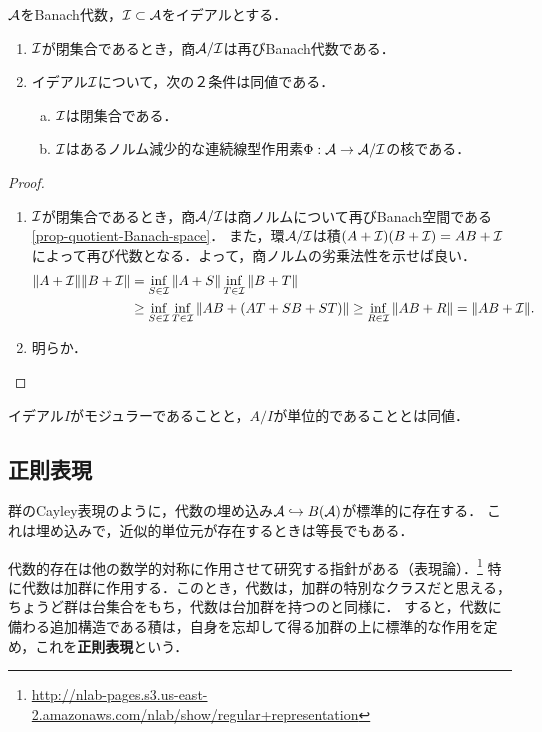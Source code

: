 \documentclass[uplatex,dvipdfmx]{jsreport}
\begin{document}
\begin{lemma}[quotient]
    $\mathcal{A}$をBanach代数，$\mathcal{I}\subset \mathcal{A}$をイデアルとする．
    \begin{enumerate}
        \item $\mathcal{I}$が閉集合であるとき，商$\mathcal{A}/\mathcal{I}$は再びBanach代数である．
        \item イデアル$\mathcal{I}$について，次の２条件は同値である．
        \begin{enumerate}[(a)]
            \item $\mathcal{I}$は閉集合である．
            \item $\mathcal{I}$はあるノルム減少的な連続線型作用素$\Phi:\mathcal{A}\to \mathcal{A}/\mathcal{I}$の核である．
        \end{enumerate}
    \end{enumerate}
\end{lemma}
\begin{proof}\mbox{}
    \begin{enumerate}
        \item $\mathcal{I}$が閉集合であるとき，商$\mathcal{A}/\mathcal{I}$は商ノルムについて再びBanach空間である\ref{prop-quotient-Banach-space}．
        また，環$\mathcal{A}/\mathcal{I}$は積$(A+\mathcal{I})(B+\mathcal{I})=AB+\mathcal{I}$によって再び代数となる．よって，商ノルムの劣乗法性を示せば良い．
        \begin{align*}
            \|A+\mathcal{I}\|\|B+\mathcal{I}\|&=\inf_{S\in\mathcal{I}}\|A+S\|\inf_{T\in\mathcal{I}}\|B+T\|\\
            &\ge\inf_{S\in\mathcal{I}}\inf_{T\in\mathcal{I}}\|AB+(AT+SB+ST)\|\ge\inf_{R\in\mathcal{I}}\|AB+R\|=\|AB+\mathcal{I}\|.
        \end{align*}
        \item 明らか．
    \end{enumerate}
\end{proof}

\begin{lemma}
    イデアル$I$がモジュラーであることと，$A/I$が単位的であることとは同値．
\end{lemma}

\subsection{正則表現}

\begin{tcolorbox}[colframe=ForestGreen, colback=ForestGreen!10!white,breakable,colbacktitle=ForestGreen!40!white,coltitle=black,fonttitle=\bfseries\sffamily,
title=]
    群のCayley表現のように，代数の埋め込み$\mathcal{A}\hookrightarrow B(\mathcal{A})$が標準的に存在する．
    これは埋め込みで，近似的単位元が存在するときは等長でもある．

    代数的存在は他の数学的対称に作用させて研究する指針がある（表現論）．\footnote{\url{http://nlab-pages.s3.us-east-2.amazonaws.com/nlab/show/regular+representation}}
    特に代数は加群に作用する．このとき，代数は，加群の特別なクラスだと思える，ちょうど群は台集合をもち，代数は台加群を持つのと同様に．
    すると，代数に備わる追加構造である積は，自身を忘却して得る加群の上に標準的な作用を定め，これを\textbf{正則表現}という．
\end{tcolorbox}
\end{document}
